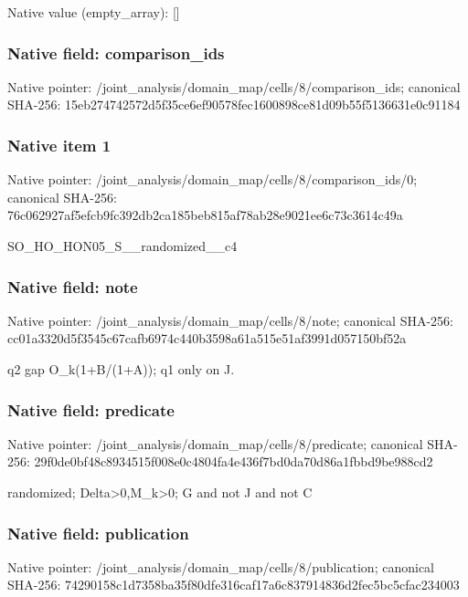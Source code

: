 \documentclass[10pt,a4paper]{article}
\begin{document}
Native value (empty\_\allowbreak{}array): []

\subsubsection{Native field: comparison\_\allowbreak{}ids}
Native pointer: /joint\_\allowbreak{}analysis/domain\_\allowbreak{}map/cells/8/comparison\_\allowbreak{}ids; canonical SHA-256: 15eb274742572d5f35ce6ef90578fec1600898ce81d09b55f5136631e0c91184

\subsubsection{Native item 1}
Native pointer: /joint\_\allowbreak{}analysis/domain\_\allowbreak{}map/cells/8/comparison\_\allowbreak{}ids/0; canonical SHA-256: 76c062927af5efcb9fc392db2ca185beb815af78ab28e9021ee6c73c3614c49a

\begingroup\raggedright\sloppy SO\_\allowbreak{}HO\_\allowbreak{}HON05\_\allowbreak{}S\_\allowbreak{}\_\allowbreak{}randomized\_\allowbreak{}\_\allowbreak{}c4\par\endgroup

\subsubsection{Native field: note}
Native pointer: /joint\_\allowbreak{}analysis/domain\_\allowbreak{}map/cells/8/note; canonical SHA-256: cc01a3320d5f3545c67cafb6974c440b3598a61a515e51af3991d057150bf52a

\begingroup\raggedright\sloppy q2 gap O\_\allowbreak{}k(1+B/\allowbreak{}(1+A));\allowbreak{} q1 only on J.\par\endgroup

\subsubsection{Native field: predicate}
Native pointer: /joint\_\allowbreak{}analysis/domain\_\allowbreak{}map/cells/8/predicate; canonical SHA-256: 29f0de0bf48c8934515f008e0c4804fa4e436f7bd0da70d86a1fbbd9be988cd2

\begingroup\raggedright\sloppy randomized;\allowbreak{} Delta>0,\allowbreak{}M\_\allowbreak{}k>0;\allowbreak{} G and not J and not C\par\endgroup

\subsubsection{Native field: publication}
Native pointer: /joint\_\allowbreak{}analysis/domain\_\allowbreak{}map/cells/8/publication; canonical SHA-256: 74290158c1d7358ba35f80dfe316caf17a6c837914836d2fec5bc5cfac234003
\end{document}
